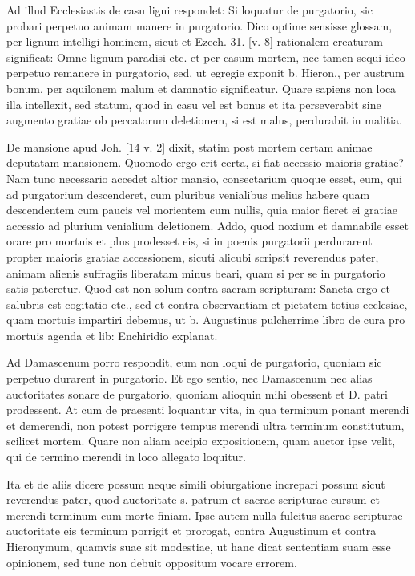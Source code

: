 Ad illud Ecclesiastis de casu ligni respondet: Si loquatur de purgatorio, sic probari perpetuo animam manere in purgatorio. Dico optime sensisse glossam, per lignum intelligi hominem, sicut et Ezech. 31. [v. 8] rationalem creaturam significat: Omne lignum paradisi etc. et per casum mortem, nec tamen sequi ideo perpetuo remanere in purgatorio, sed, ut egregie exponit b. Hieron., per austrum bonum, per aquilonem malum et damnatio significatur. Quare sapiens non loca illa intellexit, sed statum, quod in casu vel est bonus et ita perseverabit sine augmento gratiae ob peccatorum deletionem, si est malus, perdurabit in malitia.

De mansione apud Joh. [14 v. 2] dixit, statim post mortem certam animae deputatam mansionem. Quomodo ergo erit certa, si fiat accessio maioris gratiae? Nam tunc necessario accedet altior mansio, consectarium quoque esset, eum, qui ad purgatorium descenderet, cum pluribus venialibus melius habere quam descendentem cum paucis vel morientem cum nullis, quia maior fieret ei gratiae accessio ad plurium venialium deletionem. Addo, quod noxium et damnabile esset orare pro mortuis et plus prodesset eis, si in poenis purgatorii perdurarent propter maioris gratiae accessionem, sicuti alicubi scripsit reverendus pater, animam alienis suffragiis liberatam minus beari, quam si per se in purgatorio satis pateretur. Quod est non solum contra sacram \marginpar{\small[337]} scripturam: Sancta ergo et salubris est cogitatio etc., sed et contra observantiam et pietatem totius ecclesiae, quam mortuis impartiri debemus, ut b. Augustinus pulcherrime libro de cura pro mortuis agenda et lib: Enchiridio explanat.

Ad Damascenum porro respondit, eum non loqui de purgatorio, quoniam sic perpetuo durarent in purgatorio. Et ego sentio, nec Damascenum nec alias auctoritates sonare de purgatorio, quoniam alioquin mihi obessent et D. patri prodessent. At cum de praesenti loquantur vita, in qua terminum ponant merendi et demerendi, non potest porrigere tempus merendi ultra terminum constitutum, scilicet mortem. Quare non aliam accipio expositionem, quam auctor ipse velit, qui de termino merendi in loco allegato loquitur.

Ita et de aliis dicere possum neque simili obiurgatione increpari possum sicut reverendus pater, quod auctoritate s. patrum et sacrae scripturae cursum et merendi terminum cum morte finiam. Ipse autem nulla fulcitus sacrae scripturae auctoritate eis terminum porrigit et prorogat, contra Augustinum et contra Hieronymum, quamvis suae sit modestiae, ut hanc dicat sententiam suam esse opinionem, sed tunc non debuit oppositum vocare errorem.


